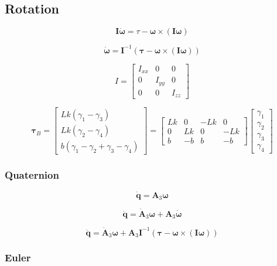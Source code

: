\subsection{Rotation}

\[
\mathbf{I} \dot{\boldsymbol\omega}
= \tau - \boldsymbol\omega \times \left( \mathbf{I} \boldsymbol\omega \right)
\]

\[
\dot{\boldsymbol\omega}
= \mathbf{I}^{-1} \left( \boldsymbol\tau - \boldsymbol\omega \times \left( \mathbf{I} \boldsymbol\omega \right) \right)
\]

\[
I =
\begin{bmatrix}
I_{xx} & 0 & 0 \\
0 & I_{yy} & 0 \\
0 & 0 & I_{zz}
\end{bmatrix}
\]

\[
\boldsymbol\tau_B =
\begin{bmatrix}
Lk \left( \gamma_1 - \gamma_3 \right) \\
Lk \left( \gamma_2 - \gamma_4 \right) \\
b \left( \gamma_1 - \gamma_2 + \gamma_3 - \gamma_4 \right)
\end{bmatrix}
=
\begin{bmatrix}
Lk & 0  & -Lk & 0 \\
0  & Lk & 0   & -Lk \\
b  & -b & b   & -b
\end{bmatrix}
\begin{bmatrix}
\gamma_1 \\ \gamma_2 \\ \gamma_3 \\ \gamma_4
\end{bmatrix}
\]

\subsubsection{Quaternion}

\[
\dot{\mathbf{q}} = \mathbf{A}_3 \boldsymbol\omega
\]

\[
\ddot{\mathbf{q}} = \dot{\mathbf{A}}_3 \boldsymbol\omega + \mathbf{A}_3 \dot{\boldsymbol\omega}
\]

\[
\ddot{\mathbf{q}}
= \dot{\mathbf{A}}_3 \boldsymbol\omega
+ \mathbf{A}_3 \mathbf{I}^{-1} \left( \boldsymbol\tau - \boldsymbol\omega \times \left( \mathbf{I} \boldsymbol\omega \right) \right)
\]

\subsubsection{Euler}

